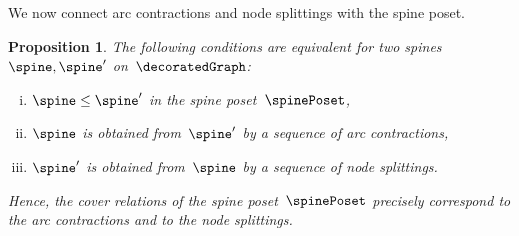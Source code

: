 \documentclass{amsart}
\newtheorem{proposition}[theorem]{Proposition}
\theoremstyle{definition}
\begin{document}
We now connect arc contractions and node splittings with the spine poset.

\begin{proposition}
  \label{prop:spinePoset}
  The following conditions are equivalent for two spines~$\spine, \spine'$ on~$\decoratedGraph$:
  \begin{enumerate}[(i)]
  \item $\spine \le \spine'$ in the spine poset~$\spinePoset$,
  \item $\spine$ is obtained from~$\spine'$ by a sequence of arc contractions,
  \item $\spine'$ is obtained from~$\spine$ by a sequence of node splittings.
  \end{enumerate}
  Hence, the cover relations of the spine poset~$\spinePoset$ precisely correspond to the arc contractions and to the node splittings.
\end{proposition}
\end{document}
